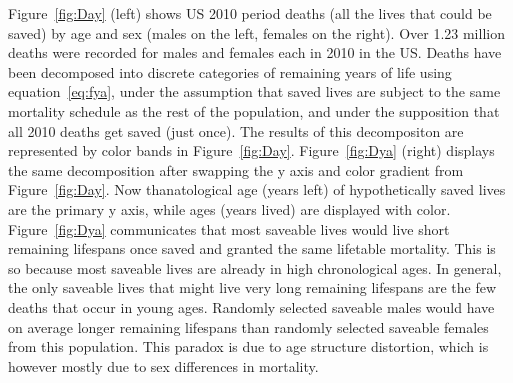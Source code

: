 \documentclass{article}
\begin{document}
Figure~\ref{fig:Day} (left) shows US 2010 period
deaths (all the lives that could be saved) by age and sex (males on the left,
females on the right). Over 1.23 million deaths were recorded for males
and females each in 2010 in the US. Deaths have been decomposed into discrete
categories of remaining years of life using equation~\eqref{eq:fya}, under the assumption that saved lives are subject to the same mortality schedule as the rest of the population, and under the supposition that all 2010 deaths get saved (just once). The results of this decompositon are represented by color bands in
Figure~\ref{fig:Day}. Figure~\ref{fig:Dya} (right) displays the same
decomposition after swapping the y axis and color gradient from
Figure~\ref{fig:Day}. Now thanatological age (years left) of
hypothetically saved lives are the primary y axis, while ages (years lived)
are displayed with color. Figure~\ref{fig:Dya} communicates that most saveable
lives would live short remaining lifespans once saved and granted the same lifetable
mortality. This is so because most saveable lives are already in high
chronological ages. In general, the only saveable lives that might live very
long remaining lifespans are the few deaths that occur in young ages. Randomly
selected saveable males would have on average longer remaining lifespans than
randomly selected saveable females from this population. This paradox is due to
age structure distortion, which is however mostly due to sex differences in
mortality.
\end{document}
